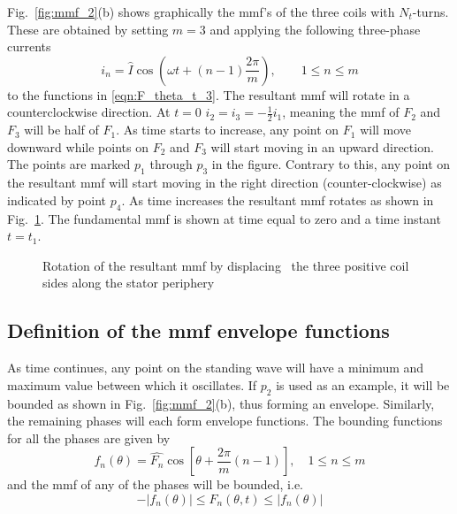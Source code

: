 Fig.~\ref{fig:mmf_2}(b) shows graphically the mmf's of the three coils with $N_t$-turns. These are obtained by setting $m=3$ and applying the following three-phase currents 
\begin{equation}
  \label{eqn:3ph_i}
   i_n = \hat{I}\cos\left(\omega t +(n-1)\frac{2\pi}{m}\right),
  \qquad
  1 \leq n \leq m
\end{equation}
to the functions in \eqref{eqn:F_theta_t_3}. The resultant mmf will rotate in a counterclockwise direction. At $t=0$ $i_2=i_3=-\frac{1}{2}i_1$, meaning the mmf of $F_2$ and $F_3$ will be half of $F_1$. As time starts to increase, any point on $F_1$ will move downward while points on $F_2$ and $F_3$ will start moving in an upward direction. The points are marked $p_1$ through $p_3$ in the figure. Contrary to this, any point on the resultant mmf will start moving in the right direction (counter-clockwise) as indicated by point $p_4$. As time increases the resultant mmf rotates as shown in Fig.~\ref{fig:rotating_wave}. The fundamental mmf is shown at time equal to zero and a time instant $t=t_1$.
\begin{figure}
	\centering
		
	\caption[Rotation of the resultant mmf]{Rotation of the resultant mmf by displacing~%
	the three positive coil sides along the stator periphery}
	\label{fig:rotating_wave}
\end{figure}

\subsection{Definition of the mmf envelope functions}\label{subsec:mmf_def}
As time continues, any point on the standing wave will have a minimum and maximum value between which it oscillates. If $p_2$ is used as an example, it will be bounded as shown in Fig.~\ref{fig:mmf_2}(b), thus forming an envelope. Similarly, the remaining phases will each form envelope functions. The bounding functions for all the phases are given by
\begin{equation}
  \label{eqn:f_bound}
  f_n(\theta) = \hat{F_n}\cos\left[\theta+\frac{2\pi}{m}(n-1) \right], 
  \quad 1 \leq n \leq m
\end{equation}
and the mmf of any of the phases will be bounded, i.e. 
\begin{equation}
  -\left|f_n(\theta)\right| \leq F_n(\theta ,t) \leq \left|f_n(\theta)\right|
\end{equation}


